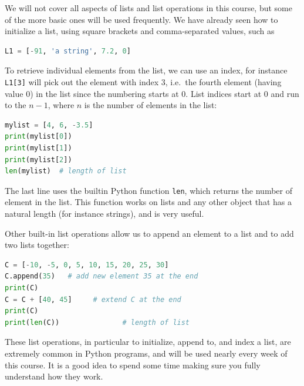 \documentclass[graybox,envcountchap,sectrefs,final]{svmonodo}
\begin{document}
We will not cover all aspects of lists and list operations in this course, but some of the more basic ones will be
used frequently. We have already seen how to initialize a list, using square brackets and comma-separated values, such as
\begin{lstlisting}[language=Python,style=blue1]
L1 = [-91, 'a string', 7.2, 0]
\end{lstlisting}
To retrieve individual elements from the list, we can use an index, for instance \texttt{L1[3]} will pick out the element with index 3,
i.e.~the fourth element (having value 0) in the list since the numbering starts at 0. List indices start
at 0 and run to the $n-1$, where $n$ is the number of elements in the list:
\begin{lstlisting}[language=Python,style=blue1]
mylist = [4, 6, -3.5]
print(mylist[0])
print(mylist[1])
print(mylist[2])
len(mylist)  # length of list
\end{lstlisting}
The last line uses the builtin Python function \texttt{len}, which returns the number of element in the list. This function works on
lists and any other object that has a natural length (for instance strings), and is very useful.

Other built-in list operations allow us to append an element to a list and to add two lists together:
\begin{lstlisting}[language=Python,style=blue1]
C = [-10, -5, 0, 5, 10, 15, 20, 25, 30]
C.append(35)   # add new element 35 at the end
print(C)
C = C + [40, 45]     # extend C at the end
print(C)
print(len(C))               # length of list
\end{lstlisting}
These list operations, in particular to initialize, append to, and index a list, are extremely common in Python programs, and
will be used nearly every week of this course. It is a good idea to spend some time making sure you fully understand how they work.
\end{document}
